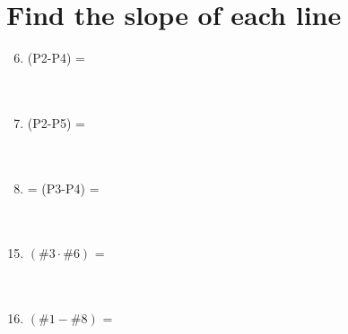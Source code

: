 \documentclass[12pt]{article}
\begin{document}
\section{Find the slope of each line}
\begin{minipage}[t]{0.6\textwidth}
    \begin{enumerate}
        \setcounter{enumi}{5} 
        \item (P2-P4) = %
        \\\\\\
        \item (P2-P5) = %
        \\\\\\
        \item = (P3-P4) = %
        \\\\\\
    \end{enumerate}
\end{minipage}
\begin{minipage}[t]{0.6\textwidth}
    \begin{enumerate}[\#1]
        \setcounter{enumi}{14} %
        \item $(\#3 \cdot \#6)$ = %
        \\\\\\
        \item $(\#1 - \#8)$ = %
        \\\\\\
        \\\\\\
    \end{enumerate}
\end{minipage}
\end{document}
